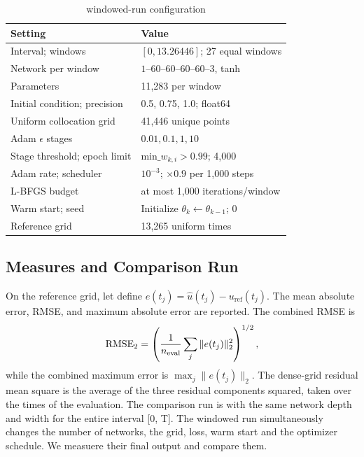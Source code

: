 \documentclass[conference]{IEEEtran}
\begin{document}
\begin{table}[t]
\caption{windowed-run configuration}
\label{tab:config}
\centering\footnotesize
\begin{tabular}{ll}
\toprule
Setting & Value\\
\midrule
Interval; windows & $[0,13.26446]$; 27 equal windows\\
Network per window & $1$--$60$--$60$--$60$--$60$--$3$, tanh\\
Parameters & 11,283 per window\\
Initial condition; precision & 0.5, 0.75, 1.0; float64\\
Uniform collocation grid & 41,446 unique points\\
Adam $\epsilon$ stages & $0.01,0.1,1,10$\\
Stage threshold; epoch limit & min$\_w_{k,i}>0.99$; 4,000\\
Adam rate; scheduler & $10^{-3}$; $\times0.9$ per 1,000 steps\\
L-BFGS budget & at most 1,000 iterations/window\\
Warm start; seed & Initialize $\theta_k\gets\theta_{k-1}$; 0\\
Reference grid & 13,265 uniform times\\
\bottomrule
\end{tabular}
\end{table}

\subsection{Measures and Comparison Run}
On the reference grid, let define $e(t_j)=\hat{u}(t_j)-u_{\mathrm{ref}}(t_j)$. The mean absolute error, RMSE, and maximum absolute error are reported. The combined RMSE is
\begin{equation}
\operatorname{RMSE}_{2}=\left(\frac{1}{n_{\rm eval}}\sum_j\|e(t_j)\|_2^2\right)^{1/2},
\label{eq:rmse}
\end{equation}
while the combined maximum error is $\max_j\|e(t_j)\|_2$. 
The dense-grid residual mean square is the average of the three residual components squared, taken over the times of the evaluation. The comparison run is with the same network depth and width for the entire interval [0, T]. The windowed run simultaneously changes the number of networks, the grid, loss, warm start and
the optimizer schedule. We measuere their final output and compare them.
\end{document}
